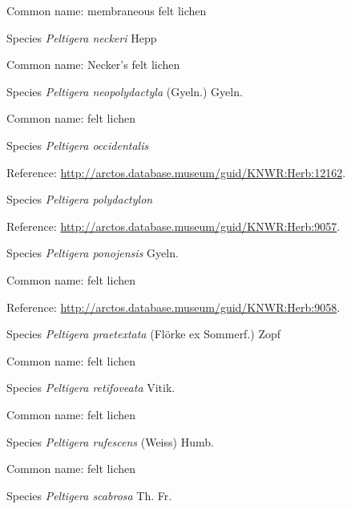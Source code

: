 \documentclass[9pt, article]{memoir}
\begin{document}
\begin{multicols}{2}
Common name: membraneous felt lichen

\vspace{6pt}\noindent\hspace{36pt}Species \textit{Peltigera neckeri} Hepp


Common name: Necker's felt lichen

\vspace{6pt}\noindent\hspace{36pt}Species \textit{Peltigera neopolydactyla} (Gyeln.) Gyeln.


Common name: felt lichen

\vspace{6pt}\noindent\hspace{36pt}Species \textit{Peltigera occidentalis}


Reference: 
\url{http://arctos.database.museum/guid/KNWR:Herb:12162}.

\vspace{6pt}\noindent\hspace{36pt}Species \textit{Peltigera polydactylon}


Reference: 
\url{http://arctos.database.museum/guid/KNWR:Herb:9057}.

\vspace{6pt}\noindent\hspace{36pt}Species \textit{Peltigera ponojensis} Gyeln.


Common name: felt lichen

Reference: 
\url{http://arctos.database.museum/guid/KNWR:Herb:9058}.

\vspace{6pt}\noindent\hspace{36pt}Species \textit{Peltigera praetextata} (Flörke ex Sommerf.) Zopf


Common name: felt lichen

\vspace{6pt}\noindent\hspace{36pt}Species \textit{Peltigera retifoveata} Vitik.


Common name: felt lichen

\vspace{6pt}\noindent\hspace{36pt}Species \textit{Peltigera rufescens} (Weiss) Humb.


Common name: felt lichen

\vspace{6pt}\noindent\hspace{36pt}Species \textit{Peltigera scabrosa} Th. Fr.



\end{multicols}
\end{document}
